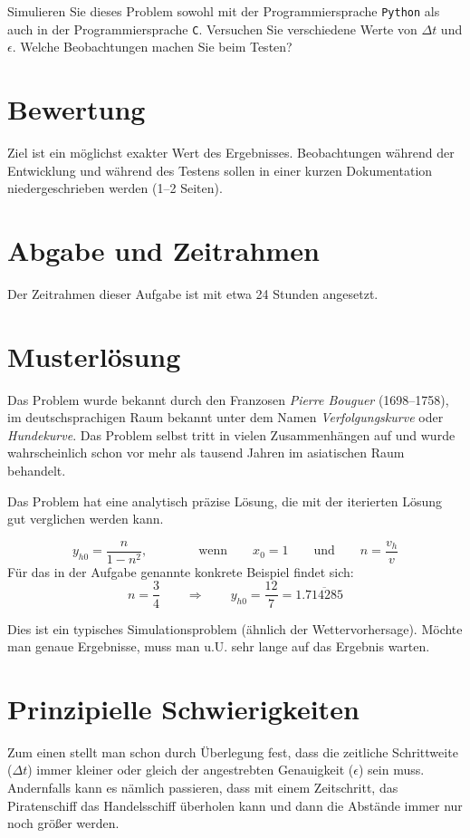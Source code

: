 \documentclass[paper=a4,notitlepage,parskip=half,plainheadsepline]{scrartcl}
\newif\ifloesung
\begin{document}
Simulieren Sie dieses Problem sowohl mit der Programmiersprache \texttt{Python} als auch in der Programmiersprache \texttt{C}. Versuchen Sie verschiedene Werte von $\Delta t$ und $\epsilon$.
Welche Beobachtungen machen Sie beim Testen?

\section{Bewertung}
Ziel ist ein möglichst exakter Wert des Ergebnisses.
Beobachtungen während der Entwicklung und während des Testens sollen in einer kurzen Dokumentation
niedergeschrieben werden (1--2 Seiten).

\section{Abgabe und Zeitrahmen}
Der Zeitrahmen dieser Aufgabe ist mit etwa 24 Stunden angesetzt.

\ifloesung
\newpage
\section{Musterlösung}
Das Problem wurde bekannt durch den Franzosen \emph{Pierre Bouguer} (1698--1758), im deutschsprachigen Raum bekannt unter dem Namen \emph{Verfolgungskurve} oder \emph{Hundekurve}. Das Problem selbst tritt in vielen Zusammenhängen auf und wurde wahrscheinlich schon vor mehr als tausend Jahren im asiatischen Raum behandelt.

Das Problem hat eine analytisch präzise Lösung, die mit der iterierten Lösung gut verglichen werden kann.

$$y_{h0} = \frac{n}{1-n^2}, \qquad\qquad \textrm{wenn}\qquad  x_0=1 \qquad \textrm{und}\qquad  n=\frac{v_h}{v}$$
Für das in der Aufgabe genannte konkrete Beispiel findet sich:
$$n=\frac{3}{4} \qquad \Rightarrow \qquad y_{h0} = \frac{12}{7} = 1.\overline{714285}$$

Dies ist ein typisches Simulationsproblem (ähnlich der Wettervorhersage).
Möchte man genaue Ergebnisse, muss man u.U. sehr lange auf das Ergebnis warten.

\section{Prinzipielle Schwierigkeiten}
Zum einen stellt man schon durch Überlegung fest, dass die zeitliche Schrittweite ($\Delta t$)
immer kleiner oder gleich der angestrebten Genauigkeit ($\epsilon$) sein muss.
Andernfalls kann es nämlich passieren, dass mit einem Zeitschritt, das Piratenschiff das Handelsschiff überholen kann und dann die Abstände immer nur noch größer werden.
\end{document}
